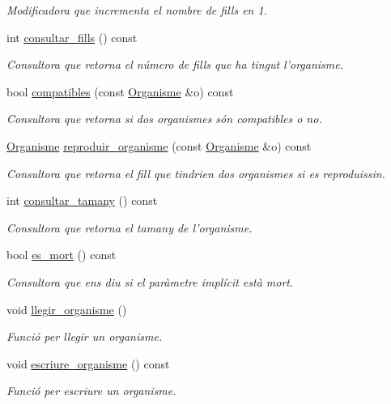 \begin{DoxyCompactItemize}
\begin{DoxyCompactList}\small\item\em Modificadora que incrementa el nombre de fills en 1. \end{DoxyCompactList}\item 
int \hyperlink{class_organisme_a908bceb8c1aa3ec7e5eeb3c5c10f111b}{consultar\-\_\-fills} () const 
\begin{DoxyCompactList}\small\item\em Consultora que retorna el número de fills que ha tingut l'organisme. \end{DoxyCompactList}\item 
bool \hyperlink{class_organisme_a4706d097ab7348c9161cc8f8a5052418}{compatibles} (const \hyperlink{class_organisme}{Organisme} \&o) const 
\begin{DoxyCompactList}\small\item\em Consultora que retorna si dos organismes són compatibles o no. \end{DoxyCompactList}\item 
\hyperlink{class_organisme}{Organisme} \hyperlink{class_organisme_a82d843de079550e169f5d479ec21619f}{reproduir\-\_\-organisme} (const \hyperlink{class_organisme}{Organisme} \&o) const 
\begin{DoxyCompactList}\small\item\em Consultora que retorna el fill que tindrien dos organismes si es reproduissin. \end{DoxyCompactList}\item 
int \hyperlink{class_organisme_a2232a1a2596db03697e6345fff587621}{consultar\-\_\-tamany} () const 
\begin{DoxyCompactList}\small\item\em Consultora que retorna el tamany de l'organisme. \end{DoxyCompactList}\item 
bool \hyperlink{class_organisme_abe3c4923cc5641e48724312bc298c8a9}{es\-\_\-mort} () const 
\begin{DoxyCompactList}\small\item\em Consultora que ens diu si el paràmetre implícit està mort. \end{DoxyCompactList}\item 
void \hyperlink{class_organisme_a056a9402130c7081b608838ba9ef2a30}{llegir\-\_\-organisme} ()
\begin{DoxyCompactList}\small\item\em Funció per llegir un organisme. \end{DoxyCompactList}\item 
void \hyperlink{class_organisme_ab359a3109ec7ff96018bbe08d97043cf}{escriure\-\_\-organisme} () const 
\begin{DoxyCompactList}\small\item\em Funció per escriure un organisme. \end{DoxyCompactList}\end{DoxyCompactItemize}
